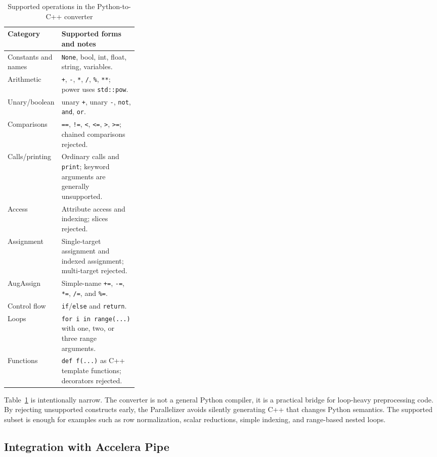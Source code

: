 \documentclass[12pt,a4paper,oneside]{report}
\begin{document}
\begin{table}[H]
\centering
\caption{Supported operations in the Python-to-C++ converter}
\label{tab:converter}
\normalsize
\renewcommand{\arraystretch}{1.05}
\setlength{\tabcolsep}{4pt}
\begin{tabularx}{\linewidth}{p{0.30\linewidth}X}
\toprule
\textbf{Category} & \textbf{Supported forms and notes} \\
\midrule
Constants and names & \texttt{None}, bool, int, float, string, variables. \\
\midrule
Arithmetic & \texttt{+}, \texttt{-}, \texttt{*}, \texttt{/}, \texttt{\%}, \texttt{**}; power uses \texttt{std::pow}. \\
\midrule
Unary/boolean & unary \texttt{+}, unary \texttt{-}, \texttt{not}, \texttt{and}, \texttt{or}. \\
\midrule
Comparisons & \texttt{==}, \texttt{!=}, \texttt{<}, \texttt{<=}, \texttt{>}, \texttt{>=}; chained comparisons rejected. \\
\midrule
Calls/printing & Ordinary calls and \texttt{print}; keyword arguments are generally unsupported. \\
\midrule
Access & Attribute access and indexing; slices rejected. \\
\midrule
Assignment & Single-target assignment and indexed assignment; multi-target rejected. \\
\midrule
AugAssign & Simple-name \texttt{+=}, \texttt{-=}, \texttt{*=}, \texttt{/=}, and \texttt{\%=}. \\
\midrule
Control flow & \texttt{if}/\texttt{else} and \texttt{return}. \\
\midrule
Loops & \texttt{for i in range(...)} with one, two, or three range arguments. \\
\midrule
Functions & \texttt{def f(...)} as C++ template functions; decorators rejected. \\
\bottomrule
\end{tabularx}
\end{table}

Table~\ref{tab:converter} is intentionally narrow. The converter is not a
general Python compiler, it is a practical bridge for loop-heavy preprocessing
code. By rejecting unsupported constructs early, the Parallelizer avoids
silently generating C++ that changes Python semantics. The supported subset is
enough for examples such as row normalization, scalar reductions, simple
indexing, and range-based nested loops.


\subsection{Integration with Accelera Pipe}
\end{document}

